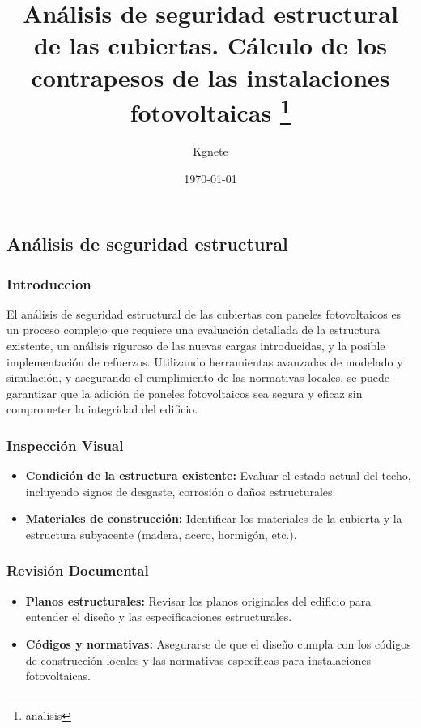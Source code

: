 \documentclass{article}
\title{Análisis de seguridad estructural de
las cubiertas. Cálculo de los contrapesos de las
instalaciones fotovoltaicas \footnote{analisis} }
\author{Kgnete}
\date{\today}
\begin{document}
\maketitle
\subsection{Análisis de seguridad estructural}

\subsubsection*{Introduccion}
    El análisis de seguridad estructural de las cubiertas con paneles fotovoltaicos es un proceso complejo que requiere una evaluación detallada de la estructura existente, un análisis riguroso de las nuevas cargas introducidas, y la posible implementación de refuerzos. Utilizando herramientas avanzadas de modelado y simulación, y asegurando el cumplimiento de las normativas locales, se puede garantizar que la adición de paneles fotovoltaicos sea segura y eficaz sin comprometer la integridad del edificio.

\subsubsection*{Inspección Visual}
\begin{itemize}
    \item \textbf{Condición de la estructura existente:} Evaluar el estado actual del techo, incluyendo signos de desgaste, corrosión o daños estructurales.
    \item \textbf{Materiales de construcción:} Identificar los materiales de la cubierta y la estructura subyacente (madera, acero, hormigón, etc.).
\end{itemize}

\subsubsection*{Revisión Documental}
\begin{itemize}
    \item \textbf{Planos estructurales:} Revisar los planos originales del edificio para entender el diseño y las especificaciones estructurales.
    \item \textbf{Códigos y normativas:} Asegurarse de que el diseño cumpla con los códigos de construcción locales y las normativas específicas para instalaciones fotovoltaicas.
\end{itemize}
\end{document}
